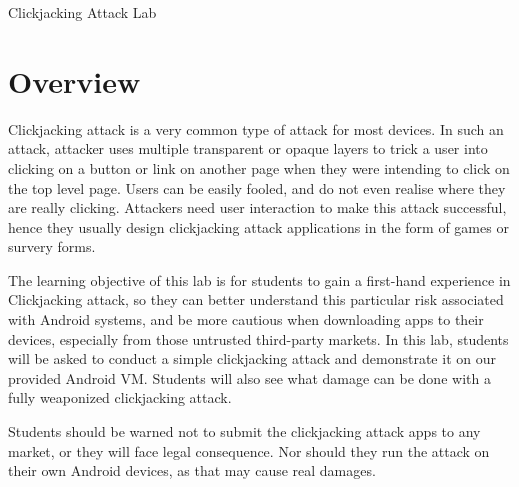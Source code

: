 



\newcommand{\clickFigs}{./Figs}





\begin{center}
{\LARGE Clickjacking Attack Lab}
\end{center}




\section{Overview}


Clickjacking attack is a very common type of attack for most devices.
In such an attack, attacker uses multiple transparent or opaque 
layers to trick a user into clicking on a button or link on another page when they 
were intending to click on the top level page. Users can be easily fooled, and do not
even realise where they are really clicking. Attackers need user interaction to make this attack 
successful, hence they usually design clickjacking attack applications in the form of games or 
survery forms.

The learning objective of this lab is for students to gain a first-hand
experience in Clickjacking attack, so they can better understand 
this particular risk associated with Android systems, and be more cautious
when downloading apps to their devices, especially from those untrusted
third-party markets. In this lab, students will be asked to conduct a simple 
clickjacking attack and demonstrate it on our provided Android VM. Students will also see 
what damage can be done with a fully weaponized clickjacking attack. 

Students should be warned not to submit the clickjacking attack apps to any market, 
or they will face legal consequence. Nor should they run the attack on their own Android devices,
as that may cause real damages.

